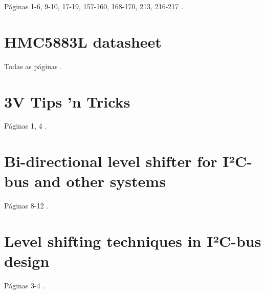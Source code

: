 \documentclass[brazil,pagestart=firstchapter]{abnt}
\begin{document}
Páginas            1-6, 9-10, 17-19, 157-160, 168-170, 213, 216-217 \cite{ATmega8}.




\chapter{HMC5883L datasheet}
\label{anx:hmc5883l_datasheet}

Todas as páginas \cite{HMC5883L}.




\chapter{3V Tips 'n Tricks}
\label{anx:3vtipsandtricks_pdf}

Páginas 1, 4 \cite{3vtipsandtricks}.




\chapter{Bi-directional level shifter for I²C-bus and other systems}
\label{anx:AN97055_pdf}

Páginas 8-12 \cite{AN97055}.




\chapter{Level shifting techniques in I²C-bus design}
\label{anx:AN10441_pdf}

Páginas 3-4 \cite{AN10441}.




%
%
%
\end{document}
